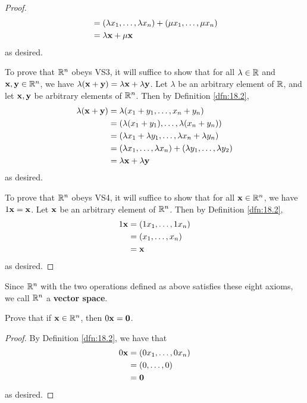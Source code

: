 \documentclass[../main.tex]{subfiles}
\begin{document}
\begin{exercise}
\begin{proof}
\begin{align*}
            &= (\lambda x_1,\dots,\lambda x_n)+(\mu x_1,\dots,\mu x_n)\\
            &= \lambda\mathbf{x}+\mu\mathbf{x}
        \end{align*}
        as desired.\par
        To prove that $\mathbb{R}^n$ obeys VS3, it will suffice to show that for all $\lambda\in\mathbb{R}$ and $\mathbf{x},\mathbf{y}\in\mathbb{R}^n$, we have $\lambda(\mathbf{x}+\mathbf{y})=\lambda\mathbf{x}+\lambda\mathbf{y}$. Let $\lambda$ be an arbitrary element of $\mathbb{R}$, and let $\mathbf{x},\mathbf{y}$ be arbitrary elements of $\mathbb{R}^n$. Then by Definition \ref{dfn:18.2},
        \begin{align*}
            \lambda(\mathbf{x}+\mathbf{y}) &= \lambda(x_1+y_1,\dots,x_n+y_n)\\
            &= (\lambda(x_1+y_1),\dots,\lambda(x_n+y_n))\\
            &= (\lambda x_1+\lambda y_1,\dots,\lambda x_n+\lambda y_n)\\
            &= (\lambda x_1,\dots,\lambda x_n)+(\lambda y_1,\dots,\lambda y_2)\\
            &= \lambda\mathbf{x}+\lambda\mathbf{y}
        \end{align*}
        as desired.\par
        To prove that $\mathbb{R}^n$ obeys VS4, it will suffice to show that for all $\mathbf{x}\in\mathbb{R}^n$, we have $1\mathbf{x}=\mathbf{x}$. Let $\mathbf{x}$ be an arbitrary element of $\mathbb{R}^n$. Then by Definition \ref{dfn:18.2},
        \begin{align*}
            1\mathbf{x} &= (1x_1,\dots,1x_n)\\
            &= (x_1,\dots,x_n)\\
            &= \mathbf{x}
        \end{align*}
        as desired.
    \end{proof}
\end{exercise}

\begin{remark}\label{rmk:18.4}
    Since $\mathbb{R}^n$ with the two operations defined as above satisfies these eight axioms, we call $\mathbb{R}^n$ a \textbf{vector space}.
\end{remark}

\begin{exercise}\label{exr:18.5}
    Prove that if $\mathbf{x}\in\mathbb{R}^n$, then $0\mathbf{x}=\bm{0}$.
    \begin{proof}
        By Definition \ref{dfn:18.2}, we have that
        \begin{align*}
            0\mathbf{x} &= (0x_1,\dots,0x_n)\\
            &= (0,\dots,0)\\
            &= \bm{0}
        \end{align*}
        as desired.
    \end{proof}
\end{exercise}
\end{document}

